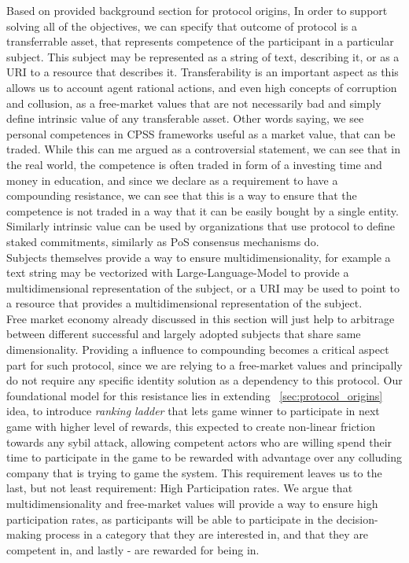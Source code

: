 \documentclass{article}
\begin{document}
\begin{CJK}{UTF8}{gbsn}
\begin{multicols}{2}
Based on provided background section for protocol origins, In order to support solving all of the objectives, we can specify that outcome of protocol is a transferrable asset, that represents competence of the participant in a particular subject. This subject may be represented as a string of text, describing it, or as a URI to a resource that describes it.
Transferability is an important aspect as this allows us to account agent rational actions, and even high concepts of corruption and collusion, as a free-market values that are not necessarily bad and simply define intrinsic value of any transferable asset. Other words saying, we see personal competences in CPSS frameworks useful as a market value, that can be traded. While this can me argued as a controversial statement, we can see that in the real world, the competence is often traded in form of a investing time and money in education, and since we declare as a requirement to have a compounding resistance, we can see that this is a way to ensure that the competence is not traded in a way that it can be easily bought by a single entity. Similarly intrinsic value can be used by organizations that use protocol to define staked commitments, similarly as PoS consensus mechanisms do.\\
Subjects themselves provide a way to ensure multidimensionality, for example a text string may be vectorized with Large-Language-Model to provide a multidimensional representation of the subject, or a URI may be used to point to a resource that provides a multidimensional representation of the subject.\\
Free market economy already discussed in this section will just help to arbitrage between different successful and largely adopted subjects that share same dimensionality.
Providing a influence to compounding becomes a critical aspect part for such protocol, since we are relying to a free-market values and principally do not require any specific identity solution as a dependency to this protocol.
Our foundational model for this resistance lies in extending  ~\ref{sec:protocol_origins} idea, to introduce \textit{ranking ladder} that lets game winner to participate in next game with higher level of rewards, this expected to create non-linear friction towards any sybil attack, allowing competent actors who are willing spend their time to participate in the game to be rewarded with advantage over any colluding company that is trying to game the system.
This requirement leaves us to the last, but not least requirement: High Participation rates.
We argue that multidimensionality and free-market values will provide a way to ensure high participation rates, as participants will be able to participate in the decision-making process in a category that they are interested in, and that they are competent in, and lastly - are rewarded for being in.

\end{multicols}
\end{CJK}
\end{document}
